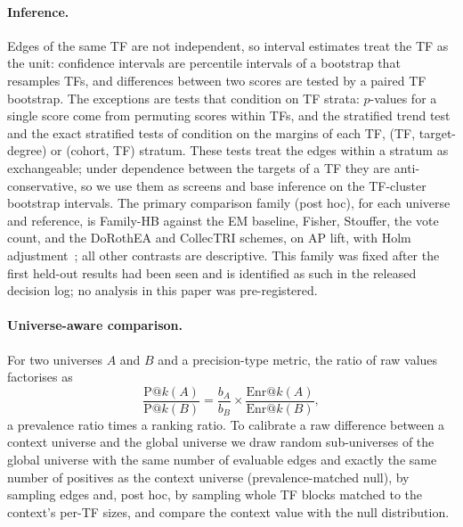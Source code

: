 \paragraph{Inference.}
Edges of the same TF are not independent, so interval estimates treat the TF as the unit: confidence intervals are percentile intervals of a bootstrap that resamples TFs, and differences between two scores are tested by a paired TF bootstrap.
The exceptions are tests that condition on TF strata: $p$-values for a single score come from permuting scores within TFs, and the stratified trend test and the exact stratified tests of  condition on the margins of each TF, (TF, target-degree) or (cohort, TF) stratum. These tests treat the edges within a stratum as exchangeable; under dependence between the targets of a TF they are anti-conservative, so we use them as screens and base inference on the TF-cluster bootstrap intervals.
The primary comparison family (post hoc), for each universe and reference, is Family-HB against the EM baseline, Fisher, Stouffer, the vote count, and the DoRothEA and CollecTRI schemes, on AP lift, with Holm adjustment~\citep{holm1979simple}; all other contrasts are descriptive.
This family was fixed after the first held-out results had been seen and is identified as such in the released decision log; no analysis in this paper was pre-registered.

\paragraph{Universe-aware comparison.}
For two universes $A$ and $B$ and a precision-type metric, the ratio of raw values factorises as
\begin{equation}
  \frac{\mathrm{P}@k(A)}{\mathrm{P}@k(B)}=\frac{b_A}{b_B}\times\frac{\mathrm{Enr}@k(A)}{\mathrm{Enr}@k(B)},
  \label{eq:decomp}
\end{equation}
a prevalence ratio times a ranking ratio.
To calibrate a raw difference between a context universe and the global universe we draw random sub-universes of the global universe with the same number of evaluable edges and exactly the same number of positives as the context universe (prevalence-matched null), by sampling edges and, post hoc, by sampling whole TF blocks matched to the context's per-TF sizes, and compare the context value with the null distribution.

